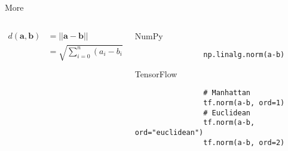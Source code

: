 \documentclass[handout]{beamer}
\begin{document}
\begin{frame}[fragile]{More}
    \begin{columns}
        \begin{column}{0.5\textwidth}
    \Large
    \begin{align*}
        d(\boldsymbol{a}, \boldsymbol{b}) &= ||\boldsymbol{a} - \boldsymbol{b}||\\
                                          &= \sqrt{\sum_{i=0}^n (a_{i} - b_{i})^2}
    \end{align*}
        \end{column}
        \begin{column}{0.5\textwidth}
            \begin{alertblock}{NumPy}
                \begin{lstlisting}
                np.linalg.norm(a-b)
                \end{lstlisting}
            \end{alertblock}
            \begin{alertblock}{TensorFlow}
                \begin{lstlisting}
                # Manhattan
                tf.norm(a-b, ord=1)
                # Euclidean
                tf.norm(a-b, ord="euclidean")
                tf.norm(a-b, ord=2)
                \end{lstlisting}
            \end{alertblock}
        \end{column}
    \end{columns}
\end{frame}
\end{document}
